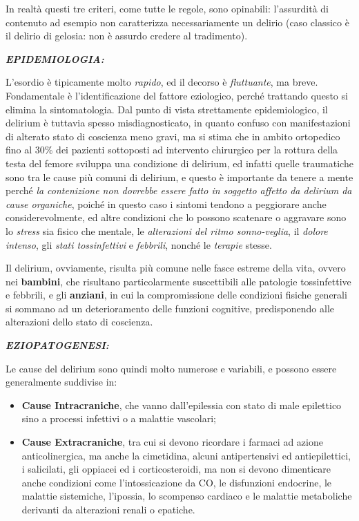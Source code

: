\documentclass[]{article}
\begin{document}
In realtà questi tre criteri, come tutte le regole, sono opinabili:
l'assurdità di contenuto ad esempio non caratterizza necessariamente un
delirio (caso classico è il delirio di gelosia: non è assurdo credere al
tradimento).

\textbf{\emph{EPIDEMIOLOGIA:}}

L'esordio è tipicamente molto \emph{rapido}, ed il decorso è
\emph{fluttuante}, ma breve. Fondamentale è l'identificazione del
fattore eziologico, perché trattando questo si elimina la
sintomatologia. Dal punto di vista strettamente epidemiologico, il
delirium è tuttavia spesso misdiagnosticato, in quanto confuso con
manifestazioni di alterato stato di coscienza meno gravi, ma si stima
che in ambito ortopedico fino al 30\% dei pazienti sottoposti ad
intervento chirurgico per la rottura della testa del femore sviluppa una
condizione di delirium, ed infatti quelle traumatiche sono tra le cause
più comuni di delirium, e questo è importante da tenere a mente perché
\emph{la contenizione non dovrebbe essere fatto in soggetto affetto da
delirium da cause organiche}, poiché in questo caso i sintomi tendono a
peggiorare anche considerevolmente, ed altre condizioni che lo possono
scatenare o aggravare sono lo \emph{stress} sia fisico che mentale, le
\emph{alterazioni del ritmo sonno-veglia}, il \emph{dolore intenso}, gli
\emph{stati tossinfettivi} e \emph{febbrili}, nonché le \emph{terapie}
stesse.

Il delirium, ovviamente, risulta più comune nelle fasce estreme della
vita, ovvero nei \textbf{bambini}, che risultano particolarmente
suscettibili alle patologie tossinfettive e febbrili, e gli
\textbf{anziani}, in cui la compromissione delle condizioni fisiche
generali si sommano ad un deterioramento delle funzioni cognitive,
predisponendo alle alterazioni dello stato di coscienza.

\textbf{\emph{EZIOPATOGENESI:}}

Le cause del delirium sono quindi molto numerose e variabili, e possono
essere generalmente suddivise in:

\begin{itemize}
\item
  \textbf{Cause Intracraniche}, che vanno dall'epilessia con stato di
  male epilettico sino a processi infettivi o a malattie vascolari;
\item
  \textbf{Cause Extracraniche}, tra cui si devono ricordare i farmaci ad
  azione anticolinergica, ma anche la cimetidina, alcuni antipertensivi
  ed antiepilettici, i salicilati, gli oppiacei ed i corticosteroidi, ma
  non si devono dimenticare anche condizioni come l'intossicazione da
  CO, le disfunzioni endocrine, le malattie sistemiche, l'ipossia, lo
  scompenso cardiaco e le malattie metaboliche derivanti da alterazioni
  renali o epatiche.
\end{itemize}
\end{document}
